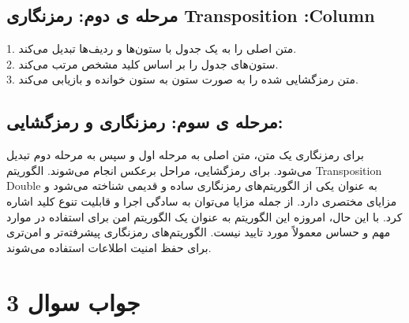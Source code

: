 \subsection{مرحله ی دوم: رمزنگاری  Transposition :Column}
1. متن اصلی را به یک جدول با ستون‌ها و ردیف‌ها تبدیل می‌کند. \\
2. ستون‌های جدول را بر اساس کلید مشخص مرتب می‌کند. \\
3. متن رمزگشایی شده را به صورت ستون به ستون خوانده و بازیابی می‌کند. 

\subsection{مرحله ی سوم: رمزنگاری و رمزگشایی:}
برای رمزنگاری یک متن، متن اصلی به مرحله اول و سپس به مرحله دوم تبدیل می‌شود.
برای رمزگشایی، مراحل برعکس انجام می‌شوند.
الگوریتم Transposition Double به عنوان یکی از الگوریتم‌های رمزنگاری ساده و قدیمی شناخته می‌شود و مزایای مختصری دارد. از جمله مزایا می‌توان به سادگی اجرا و قابلیت تنوع کلید اشاره کرد. با این حال، امروزه این الگوریتم به عنوان یک الگوریتم امن برای استفاده در موارد مهم و حساس معمولاً مورد تایید نیست. الگوریتم‌های رمزنگاری پیشرفته‌تر و امن‌تری برای حفظ امنیت اطلاعات استفاده می‌شوند.


\section{جواب سوال 3}

